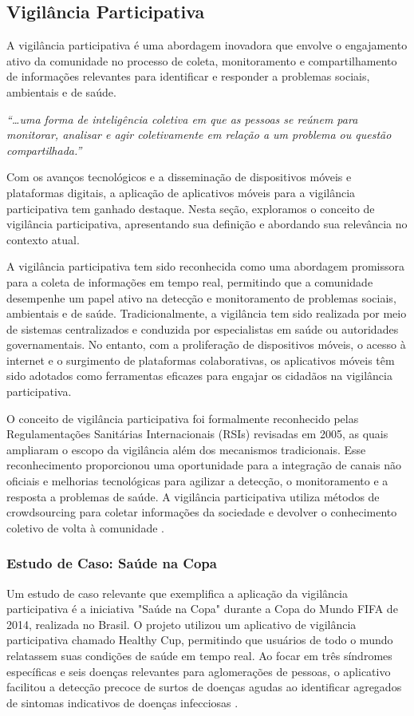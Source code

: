 \subsection*{Vigilância Participativa}
A vigilância participativa é uma abordagem inovadora que envolve o engajamento ativo da comunidade no processo de coleta, monitoramento e compartilhamento de informações relevantes para identificar e responder a problemas sociais, ambientais e de saúde.

\begin{citacao}
\textit{“…uma forma de inteligência coletiva em que as pessoas se reúnem para monitorar, analisar e agir coletivamente em relação a um problema ou questão compartilhada.”}
\end{citacao}

Com os avanços tecnológicos e a disseminação de dispositivos móveis e plataformas digitais, a aplicação de aplicativos móveis para a vigilância participativa tem ganhado destaque. Nesta seção, exploramos o conceito de vigilância participativa, apresentando sua definição e abordando sua relevância no contexto atual.

A vigilância participativa tem sido reconhecida como uma abordagem promissora para a coleta de informações em tempo real, permitindo que a comunidade desempenhe um papel ativo na detecção e monitoramento de problemas sociais, ambientais e de saúde. Tradicionalmente, a vigilância tem sido realizada por meio de sistemas centralizados e conduzida por especialistas em saúde ou autoridades governamentais. No entanto, com a proliferação de dispositivos móveis, o acesso à internet e o surgimento de plataformas colaborativas, os aplicativos móveis têm sido adotados como ferramentas eficazes para engajar os cidadãos na vigilância participativa.

O conceito de vigilância participativa foi formalmente reconhecido pelas Regulamentações Sanitárias Internacionais (RSIs) revisadas em 2005, as quais ampliaram o escopo da vigilância além dos mecanismos tradicionais. Esse reconhecimento proporcionou uma oportunidade para a integração de canais não oficiais e melhorias tecnológicas para agilizar a detecção, o monitoramento e a resposta a problemas de saúde. A vigilância participativa utiliza métodos de crowdsourcing para coletar informações da sociedade e devolver o conhecimento coletivo de volta à comunidade \cite[1]{2017_Smolinski}.

\subsubsection*{Estudo de Caso: Saúde na Copa}
Um estudo de caso relevante que exemplifica a aplicação da vigilância participativa é a iniciativa "Saúde na Copa" durante a Copa do Mundo FIFA de 2014, realizada no Brasil. O projeto utilizou um aplicativo de vigilância participativa chamado Healthy Cup, permitindo que usuários de todo o mundo relatassem suas condições de saúde em tempo real. Ao focar em três síndromes específicas e seis doenças relevantes para aglomerações de pessoas, o aplicativo facilitou a detecção precoce de surtos de doenças agudas ao identificar agregados de sintomas indicativos de doenças infecciosas \cite{2017_LealNeto}.

